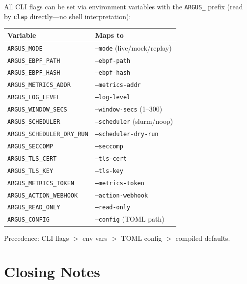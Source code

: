 \documentclass[11pt]{article}
\begin{document}
All CLI flags can be set via environment variables with the \texttt{ARGUS\_}
prefix (read by \texttt{clap} directly---no shell interpretation):

\begin{center}
\small
\begin{tabular}{lp{7cm}}
\toprule
Variable & Maps to \\
\midrule
\texttt{ARGUS\_MODE}               & \texttt{--mode} (live/mock/replay) \\
\texttt{ARGUS\_EBPF\_PATH}         & \texttt{--ebpf-path} \\
\texttt{ARGUS\_EBPF\_HASH}         & \texttt{--ebpf-hash} \\
\texttt{ARGUS\_METRICS\_ADDR}      & \texttt{--metrics-addr} \\
\texttt{ARGUS\_LOG\_LEVEL}         & \texttt{--log-level} \\
\texttt{ARGUS\_WINDOW\_SECS}       & \texttt{--window-secs} (1--300) \\
\texttt{ARGUS\_SCHEDULER}          & \texttt{--scheduler} (slurm/noop) \\
\texttt{ARGUS\_SCHEDULER\_DRY\_RUN}& \texttt{--scheduler-dry-run} \\
\texttt{ARGUS\_SECCOMP}            & \texttt{--seccomp} \\
\texttt{ARGUS\_TLS\_CERT}          & \texttt{--tls-cert} \\
\texttt{ARGUS\_TLS\_KEY}           & \texttt{--tls-key} \\
\texttt{ARGUS\_METRICS\_TOKEN}     & \texttt{--metrics-token} \\
\texttt{ARGUS\_ACTION\_WEBHOOK}    & \texttt{--action-webhook} \\
\texttt{ARGUS\_READ\_ONLY}         & \texttt{--read-only} \\
\texttt{ARGUS\_CONFIG}             & \texttt{--config} (TOML path) \\
\bottomrule
\end{tabular}
\end{center}

Precedence: CLI flags $>$ env vars $>$ TOML config $>$ compiled defaults.


\section*{Closing Notes}
\end{document}
